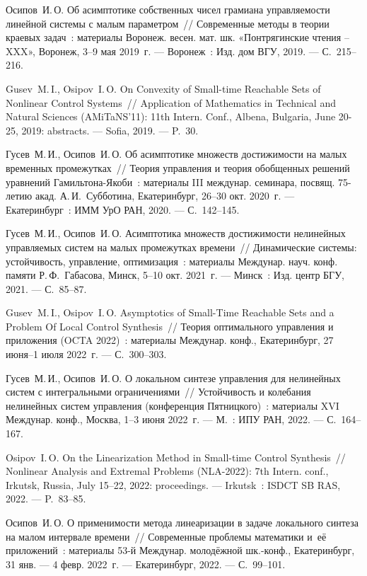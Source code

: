 Осипов~И.\,О. Об асимптотике собственных чисел грамиана управляемости линейной системы с малым параметром~// Современные методы в теории краевых задач~: материалы Воронеж. весен. мат. шк. «Понтрягинские чтения – XXX», Воронеж, 3--9 мая 2019~г. --- Воронеж~: Изд. дом ВГУ, 2019. --- С.~215--216.

Gusev~M.\,I., Osipov~I.\,O. On Convexity of Small-time Reachable Sets of Nonlinear Control Systems~// Application of Mathematics in Technical and Natural Sciences (AMiTaNS'11): 11th Intern. Conf., Albena, Bulgaria, June 20-25, 2019: abstracts. --- Sofia, 2019. --- P.~30.

Гусев~М.\,И., Осипов~И.\,О. Об асимптотике множеств достижимости на малых временных промежутках~// Теория управления и теория обобщенных решений уравнений Гамильтона-Якоби~: материалы III междунар. семинара, посвящ. 75-летию акад. А.\,И.~Субботина, Екатеринбург, 26--30 окт. 2020~г. --- Екатеринбург~: ИММ УрО РАН, 2020. --- С.~142--145.


Гусев~М.\,И., Осипов~И.\,О. Асимптотика множеств достижимости нелинейных управляемых систем на малых промежутках времени~// Динамические системы: устойчивость, управление, оптимизация~: материалы Междунар. науч. конф. памяти Р.\,Ф.~Габасова, Минск, 5--10 окт. 2021~г. --- Минск~: Изд. центр БГУ, 2021. --- С.~85--87. 

Gusev~M.\,I., Osipov~I.\,O. Asymptotics of Small-Time Reachable Sets and a Problem Of Local Control Synthesis~// Теория оптимального управления и приложения (OCTA 2022)~: материалы Междунар. конф., Екатеринбург, 27 июня–1 июля 2022~г. --- С.~300--303.

Гусев~М.\,И., Осипов~И.\,О. О локальном синтезе управления для нелинейных систем с интегральными ограничениями~// Устойчивость и колебания нелинейных систем управления (конференция Пятницкого)~: материалы XVI Междунар. конф., Москва, 1--3 июня 2022~г. --- М.~: ИПУ РАН, 2022. --- С.~164--167.

Osipov~I.\,O. On the Linearization Method in Small-time Control Synthesis~// Nonlinear Analysis and Extremal Problems (NLA-2022): 7th Intern. conf., Irkutsk, Russia, July 15–22, 2022: proceedings. --- Irkutsk~: ISDCT SB RAS, 2022. --- P.~83--85.

Осипов~И.\,О. О применимости метода линеаризации в задаче локального синтеза на малом интервале времени~// Современные проблемы математики и~её приложений~: материалы 53-й Междунар. молодёжной шк.-конф., Екатеринбург, 31 янв. --- 4 февр. 2022~г. --- Екатеринбург, 2022. --- С.~99--101.

